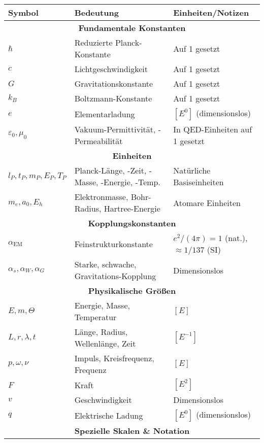 \documentclass[11pt,a4paper]{article}
\begin{document}
	{\small
		\begin{table}[htbp]
			\centering
			\begin{adjustbox}{width=0.98\textwidth}
				\begin{tabular}{lll}
					\toprule
					\textbf{Symbol} & \textbf{Bedeutung} & \textbf{Einheiten/Notizen} \\
					\midrule
					\multicolumn{3}{c}{\textbf{Fundamentale Konstanten}} \\
					$\hbar$ & Reduzierte Planck-Konstante & Auf 1 gesetzt \\
					$c$ & Lichtgeschwindigkeit & Auf 1 gesetzt \\
					$G$ & Gravitationskonstante & Auf 1 gesetzt \\
					$k_B$ & Boltzmann-Konstante & Auf 1 gesetzt \\
					$e$ & Elementarladung & $[E^0]$ (dimensionslos) \\
					$\varepsilon_0, \mu_0$ & Vakuum-Permittivität, -Permeabilität & In QED-Einheiten auf 1 gesetzt \\
					\midrule
					\multicolumn{3}{c}{\textbf{Einheiten}} \\
					$l_P, t_P, m_P, E_P, T_P$ & Planck-Länge, -Zeit, -Masse, -Energie, -Temp. & Natürliche Basiseinheiten \\
					$m_e, a_0, E_h$ & Elektronmasse, Bohr-Radius, Hartree-Energie & Atomare Einheiten \\
					\midrule
					\multicolumn{3}{c}{\textbf{Kopplungskonstanten}} \\
					$\alpha_{\text{EM}}$ & Feinstrukturkonstante & $e^2/(4\pi) = 1$ (nat.), $\approx 1/137$ (SI) \\
					$\alpha_s, \alpha_W, \alpha_G$ & Starke, schwache, Gravitations-Kopplung & Dimensionslos \\
					\midrule
					\multicolumn{3}{c}{\textbf{Physikalische Größen}} \\
					$E, m, \Theta$ & Energie, Masse, Temperatur & $[E]$ \\
					$L, r, \lambda, t$ & Länge, Radius, Wellenlänge, Zeit & $[E^{-1}]$ \\
					$p, \omega, \nu$ & Impuls, Kreisfrequenz, Frequenz & $[E]$ \\
					$F$ & Kraft & $[E^2]$ \\
					$v$ & Geschwindigkeit & Dimensionslos \\
					$q$ & Elektrische Ladung & $[E^0]$ (dimensionslos) \\
					\midrule
					\multicolumn{3}{c}{\textbf{Spezielle Skalen \& Notation}} \\

\end{tabular}
\end{adjustbox}
\end{table}}
\end{document}
